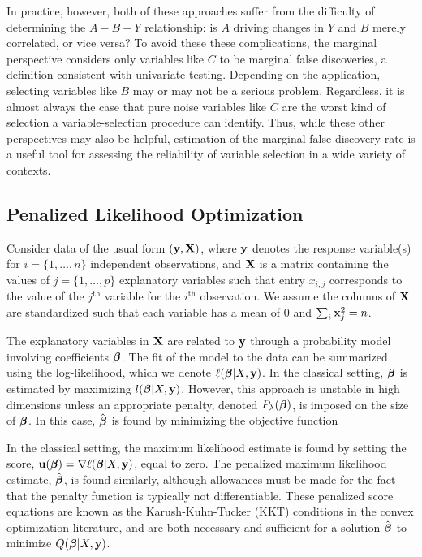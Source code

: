 In practice, however, both of these approaches suffer from the difficulty of determining the $A-B-Y$ relationship: is $A$ driving changes in $Y$ and $B$ merely correlated, or vice versa?  To avoid these these complications, the marginal perspective considers only variables like $C$ to be marginal false discoveries, a definition consistent with univariate testing.  Depending on the application, selecting variables like $B$ may or may not be a serious problem.  Regardless, it is almost always the case that pure noise variables like $C$ are the worst kind of selection a variable-selection procedure can identify.  Thus, while these other perspectives may also be helpful, estimation of the marginal false discovery rate is a useful tool for assessing the reliability of variable selection in a wide variety of contexts.

\subsection{Penalized Likelihood Optimization}

Consider data of the usual form $(\mathbf{y}, \mathbf{X})$, where $\mathbf{y}$ denotes the response variable(s) for $i = \{1, \ldots, n\}$ independent observations, and $\mathbf{X}$ is a matrix containing the values of $j = \{1, \ldots, p\}$ explanatory variables such that entry $x_{i,j}$ corresponds to the value of the $j^{\textrm{th}}$ variable for the $i^{\textrm{th}}$ observation.  We assume the columns of $\mathbf{X}$ are standardized such that each variable has a mean of $0$ and $\sum_i \mathbf{x}_j^2 = n$.

The explanatory variables in $\mathbf{X}$ are related to $\mathbf{y}$ through a probability model involving coefficients $\boldsymbol{\beta}$.  The fit of the model to the data can be summarized using the log-likelihood, which we denote $\ell(\boldsymbol{\beta}|X,\mathbf{y})$.  In the classical setting, $\boldsymbol{\beta}$ is estimated by maximizing $l(\boldsymbol{\beta}|X,\mathbf{y})$.  However, this approach is unstable in high dimensions unless an appropriate penalty, denoted $P_{\lambda}(\boldsymbol{\beta})$, is imposed on the size of $\boldsymbol{\beta}$.
In this case, $\hat{\boldsymbol{\beta}}$ is found by minimizing the objective function


In the classical setting, the maximum likelihood estimate is found by setting the score, $\mathbf{u}(\boldsymbol{\beta}) = \nabla \ell(\boldsymbol{\beta}|X,\mathbf{y})$, equal to zero.  The penalized maximum likelihood estimate, $\hat{\boldsymbol{\beta}}$, is found similarly, although allowances must be made for the fact that the penalty function is typically not differentiable.  These penalized score equations are known as the Karush-Kuhn-Tucker (KKT) conditions in the convex optimization literature, and are both necessary and sufficient for a solution $\hat{\boldsymbol{\beta}}$ to minimize $Q(\boldsymbol{\beta}|X,\mathbf{y})$.


